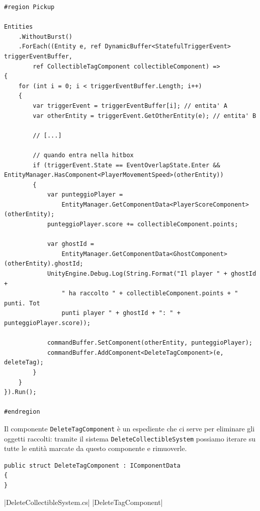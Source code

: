 \begin{lstlisting}[caption={File \UseVerb{PickUpSystemTerm}: aumento del punteggio del giocatore e aggiunta del tag \UseVerb{DeleteTagComponentTerm} agli oggetti raccoglibili.}, label={lst:prototipo-pickup}, language={[Sharp]C}]
#region Pickup

Entities
    .WithoutBurst()
    .ForEach((Entity e, ref DynamicBuffer<StatefulTriggerEvent> triggerEventBuffer,
        ref CollectibleTagComponent collectibleComponent) =>
{
    for (int i = 0; i < triggerEventBuffer.Length; i++)
    {
        var triggerEvent = triggerEventBuffer[i]; // entita' A
        var otherEntity = triggerEvent.GetOtherEntity(e); // entita' B
        
        // [...]
        
        // quando entra nella hitbox
        if (triggerEvent.State == EventOverlapState.Enter && EntityManager.HasComponent<PlayerMovementSpeed>(otherEntity))
        {
            var punteggioPlayer =
                EntityManager.GetComponentData<PlayerScoreComponent>(otherEntity);
            punteggioPlayer.score += collectibleComponent.points;

            var ghostId =
                EntityManager.GetComponentData<GhostComponent>(otherEntity).ghostId;
            UnityEngine.Debug.Log(String.Format("Il player " + ghostId + 
                " ha raccolto " + collectibleComponent.points + " punti. Tot 
                punti player " + ghostId + ": " + punteggioPlayer.score));

            commandBuffer.SetComponent(otherEntity, punteggioPlayer);
            commandBuffer.AddComponent<DeleteTagComponent>(e, deleteTag);
        }
    }
}).Run();

#endregion
\end{lstlisting}

Il componente \verb|DeleteTagComponent| è un espediente che ci serve per eliminare gli oggetti raccolti: tramite il sistema \verb|DeleteCollectibleSystem| possiamo iterare su tutte le entità marcate da questo componente e rimuoverle.

\begin{lstlisting}[caption={Componente che marca un'entità come ``da eliminare''.}, label={lst:prototipo-delete-tag}, language={[Sharp]C}]
public struct DeleteTagComponent : IComponentData
{
}
\end{lstlisting}

|DeleteCollectibleSystem.cs|
|DeleteTagComponent|


